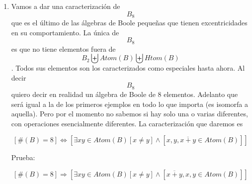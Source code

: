 \begin{enumerate}
\begin{enumerate}
\begin{enumerate}
\begin{enumerate}
        Entonces:

        \begin{enumerate}
        \def\labelenumv{\arabic{enumv}.}
        \item
          \[\mathit{Htom}{{(B)} \supseteq {\{{\overline{x},\overline{y}}\}}}\]
        \item
          \[{x + y} \neq 1\]
        \item
          Ponemos sin pérdida de generalidad

          \[{x + y} = \overline{x}\]
        \item
          \[{{{{0 = {x + \overline{x}}} = {x + {({x + y})}}} = {{({x + x})} + y}} = {x + y}} = \overline{x}\]
        \item
          \[1 = x\]
        \item
          \[{6 = \#}{B = 2}\mathit{ABSURDO}\]
        \end{enumerate}
      \item
        \[\forall{{\{{x,y}\}} \in \wp}{(B)}{{\{{x,y}\}} \nsubseteq B}\mathit{ABSURDO}\]
      \end{enumerate}
    \item
      Vamos a dar una caracterización de \[B_{8}\] que es el último de
      las álgebras de Boole pequeñas que tienen excentricidades en su
      comportamiento. La única de \[B_{8}\] es que no tiene elementos
      fuera de
      \[B_{2}\biguplus{\mathit{Atom}{(B)}}\biguplus{\mathit{Htom}{(B)}}\].
      Todos sus elementos son los caracterizados como especiales hasta
      ahora. Al decir \[B_{8}\] quiero decir en realidad un álgebra de
      Boole de 8 elementos. Adelanto que será igual a la de los primeros
      ejemplos en todo lo que importa (es isomorfa a aquella). Pero por
      el momento no sabemos si hay solo una o varias diferentes, con
      operaciones esencialmente diferentes. La caracterización que
      daremos es

      \[\left\lbrack {\#{{(B)} = 8}} \right\rbrack\Leftrightarrow\left\lbrack {\exists{\mathit{xy} \in \mathit{Atom}}{(B)}{\left\lbrack {x \neq y} \right\rbrack \land \left\lbrack {x,y,{\overline{x+y} \in \mathit{Atom}}{(B)}} \right\rbrack}} \right\rbrack\]

      Prueba:

      \[\left\lbrack {\#{{(B)} = 8}} \right\rbrack\Rightarrow\left\lbrack {\exists{\mathit{xy} \in \mathit{Atom}}{(B)}{\left\lbrack {x \neq y} \right\rbrack \land \left\lbrack {\overline{x+y},x,{y \in \mathit{Atom}}{(B)}} \right\rbrack}} \right\rbrack\]


\end{enumerate}
\end{enumerate}
\end{enumerate}
